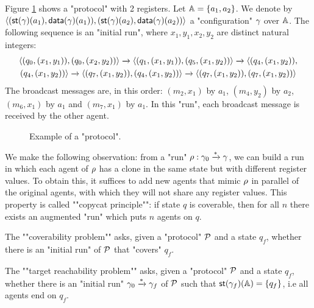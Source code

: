 \begin{example}\label{ex:example-1}
	Figure \ref{fig:ex1} shows a "protocol" with 2 registers. 
	Let $\mathbb{A} = \{a_1, a_2\}$. We denote by $\langle (\mathsf{st}(\gamma)(a_1), \mathsf{data}(\gamma)(a_1)), (\mathsf{st}(\gamma)(a_2),\mathsf{data}(\gamma)(a_2)) \rangle$ a "configuration" $\gamma$ over $\mathbb{A}$. The following sequence is an "initial run", where $x_1,y_1,x_2,y_2$ are distinct natural integers:
	\begin{multline*}
	\langle (q_0, (x_1,y_1)), (q_0,(x_2,y_2)) \rangle \xrightarrow{} \langle (q_1, (x_1,y_1)), (q_5,(x_1,y_2)) \rangle \xrightarrow{} 
	\langle (q_4, (x_1,y_2)),\\ (q_4,(x_1,y_2)) \rangle \xrightarrow{} \langle (q_7, (x_1,y_2)), (q_4,(x_1,y_2)) \rangle \xrightarrow{} \langle (q_7, (x_1,y_2)), (q_7,(x_1,y_2)) \rangle
	\end{multline*}
	The broadcast messages are, in this order: $(m_2,x_1)$ by $a_1$, $(m_4,y_2)$ by $a_2$, $(m_6,x_1)$ by $a_1$ and $(m_7,x_1)$ by $a_1$. In this "run", each broadcast message is received by the other agent. 
\end{example}

\begin{figure}[t]
	\centering
	\resizebox*{!}{3.2cm}{
		
	}
	\vspace{-0.4cm}
	\caption{Example of a "protocol".}\label{fig:ex1}
\end{figure}
	
	


\begin{remark}
	\label{rem:copycat-principle}
	We make the following observation: from a "run" $\rho : \gamma_0 \xrightarrow{\ast} \gamma$, we can build a run in which each agent of $\rho$ has  a clone in the same state but with different register values. To obtain this, it suffices to add new agents that mimic $\rho$ in parallel of the original agents, with which they will not share any register values.  This property is called ""copycat principle"": if state $q$ is coverable, then for all $n$ there exists an augmented "run" which puts $n$ agents on $q$.
\end{remark}

	
\begin{definition}

	\AP The ""coverability problem"" \COVER asks, given a "protocol" $\mathcal{P}$ and a state $q_f$, whether there is an "initial run" of $\mathcal{P}$ that "covers" $q_f$.
	
	\AP The ""target reachability problem"" \TARGET asks, given a "protocol" $\mathcal{P}$ and a state $q_f$, whether there is an "initial run" $\gamma_0 \xrightarrow{*} \gamma_f$ of $\mathcal{P}$ such that $\mathsf{st}(\gamma_f)(\mathbb{A}) = \{q_f\}$, i.e all agents end on $q_f$.
\end{definition}

